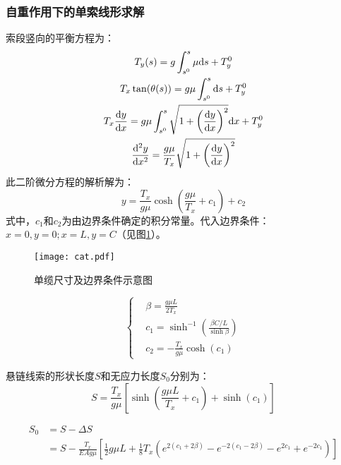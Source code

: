 \subsubsection{自重作用下的单索线形求解}
索段竖向的平衡方程为\cite{bhattacharya2010time}：
\begin{gather}
	T_y(s) = g \int_{s^0}^{s} \mu \mathrm{d}s + T_y^0 \notag \\
	T_x \tan(\theta(s)) = g \mu \int_{s^0}^{s} \mathrm{d}s + T_y^0 \notag \\
	T_x \frac{\mathrm{d} y}{\mathrm{d} x} = g \mu \int_{s^0}^{s} \sqrt{1+\left(\frac{\mathrm{d} y}{\mathrm{d} x}\right)^2} \mathrm{d}x + T_y^0 \notag \\
	\frac{\mathrm{d}^2 y}{\mathrm{d} x^2} = \frac{g \mu}{T_x} \sqrt{1+\left(\frac{\mathrm{d} y}{\mathrm{d} x}\right)^2}
\end{gather}
此二阶微分方程的解析解为：
\begin{equation}
	y = \frac{T_x}{g \mu} \cosh \left( \frac{g \mu}{T_x} + c_1 \right)+c_2
\end{equation}
式中，$c_1$和$c_2$为由边界条件确定的积分常量。代入边界条件：$x=0,y=0;x=L,y=C$（见图\ref{fig:cat}）。

\begin{figure}[!htpb]
	\centering
	\texttt{[image: cat.pdf]}
	\caption{单缆尺寸及边界条件示意图}
	\label{fig:cat}
\end{figure}

\begin{equation}
	\left \{
	\begin{aligned}
		  & \beta = \frac{g \mu L}{2 T_x}                                \\
		  & c_1 = \sinh^{-1}\left(\frac{\beta C / L}{\sinh \beta}\right) \\
		  & c_2 = -\frac{T_x}{g \mu} \cosh(c_1)                          
	\end{aligned}
	\right.
\end{equation}

悬链线索的形状长度$S$和无应力长度$S_0$分别为：
\begin{equation}
	S = \frac{T_x}{g\mu}\left[\sinh\left(\frac{g \mu L}{T_x}+c_1\right)+\sinh(c_1)\right]
\end{equation}

\begin{equation}
	\begin{split}
		S_0 &= S-\Delta S \\
		&= S - \frac{T_x}{EA g \mu }\left[ \frac{1}{2} g \mu L + \frac{1}{8} T_x \left( e^{2(c_1+2\beta)} - e^{-2(c_1-2\beta)} -e^{2c_1} + e^{-2c_1} \right) \right]
	\end{split}
\end{equation}

